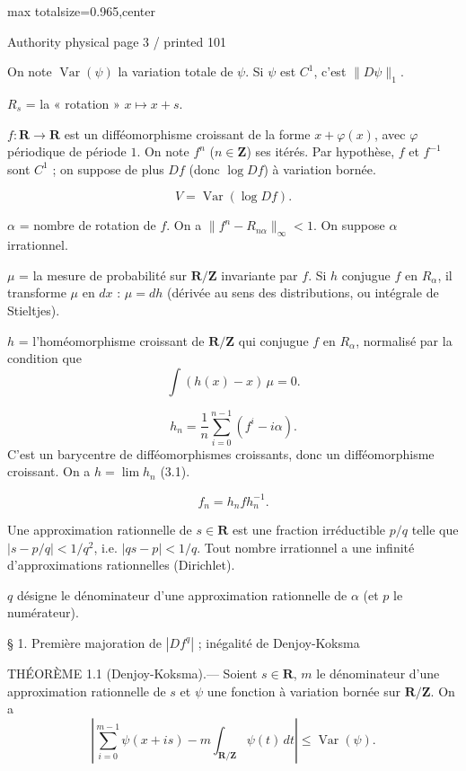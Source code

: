 \documentclass{article}
\begin{document}
\newpage
\noindent\begin{adjustbox}{max totalsize={\textwidth}{0.965\textheight},center}\begin{minipage}{\textwidth}
\noindent\hfill\scriptsize Authority physical page 3 / printed 101\par\normalsize
On note \(\operatorname{Var}(\psi)\) la variation totale de \(\psi\). Si \(\psi\) est \(C^1\), c’est \(\|D\psi\|_1\).

\(R_s\) = la « rotation » \(x\longmapsto x+s\).

\(f:\mathbf R\to\mathbf R\) est un difféomorphisme croissant de la forme \(x+\varphi(x)\), avec \(\varphi\) périodique de période \(1\). On note \(f^n\) (\(n\in\mathbf Z\)) ses itérés. Par hypothèse, \(f\) et \(f^{-1}\) sont \(C^1\) ; on suppose de plus \(Df\) (donc \(\log Df\)) à variation bornée.

\[
V=\operatorname{Var}(\log Df).
\]

\(\alpha\) = nombre de rotation de \(f\). On a \(\|f^n-R_{n\alpha}\|_\infty<1\). On suppose \(\alpha\) irrationnel.

\(\mu\) = la mesure de probabilité sur \(\mathbf R/\mathbf Z\) invariante par \(f\). Si \(h\) conjugue \(f\) en \(R_\alpha\), il transforme \(\mu\) en \(dx\) : \(\mu=dh\) (dérivée au sens des distributions, ou intégrale de Stieltjes).

\(h\) = l’homéomorphisme croissant de \(\mathbf R/\mathbf Z\) qui conjugue \(f\) en \(R_\alpha\), normalisé par la condition que
\[
\int (h(x)-x)\,\mu=0.
\]

\[
h_n=\frac1n\sum_{i=0}^{n-1}(f^i-i\alpha).
\]
C’est un barycentre de difféomorphismes croissants, donc un difféomorphisme croissant. On a \(h=\lim h_n\) (3.1).

\[
f_n=h_nfh_n^{-1}.
\]

Une approximation rationnelle de \(s\in\mathbf R\) est une fraction irréductible \(p/q\) telle que \(|s-p/q|<1/q^2\), i.e. \(|qs-p|<1/q\). Tout nombre irrationnel a une infinité d’approximations rationnelles (Dirichlet).

\(q\) désigne le dénominateur d’une approximation rationnelle de \(\alpha\) (et \(p\) le numérateur).

§ 1. Première majoration de \(|Df^q|\) ; inégalité de Denjoy-Koksma

THÉORÈME 1.1 (Denjoy-Koksma).— Soient \(s\in\mathbf R\), \(m\) le dénominateur d’une approximation rationnelle de \(s\) et \(\psi\) une fonction à variation bornée sur \(\mathbf R/\mathbf Z\). On a
\[
\left|\sum_{i=0}^{m-1}\psi(x+is)-m\int_{\mathbf R/\mathbf Z}\psi(t)\,dt\right|\leq\operatorname{Var}(\psi).
\]
\end{minipage}\end{adjustbox}
\end{document}
